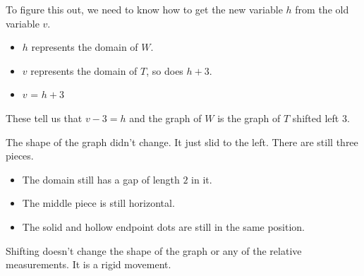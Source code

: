 \documentclass{ximera}
\begin{document}
\begin{example}
To figure this out, we need to know how to get the new variable $h$ from the old variable $v$. 




\begin{itemize}
\item $h$ represents the domain of $W$. 
\item $v$ represents the domain of $T$, so does $h+3$.  
\item $v$ = $h+3$
\end{itemize}


These tell us that $v-3 = h$ and the graph of $W$ is the graph of $T$ shifted left $3$.



\end{example}


The shape of the graph didn't change. It just slid to the left. There are still three pieces. 




\begin{itemize}
\item The domain still has a gap of length $2$ in it.  
\item The middle piece is still horizontal.  
\item The solid and hollow endpoint dots are still in the same position. 
\end{itemize}





Shifting doesn't change the shape of the graph or any of the relative measurements. It is a rigid movement.
\end{document}
